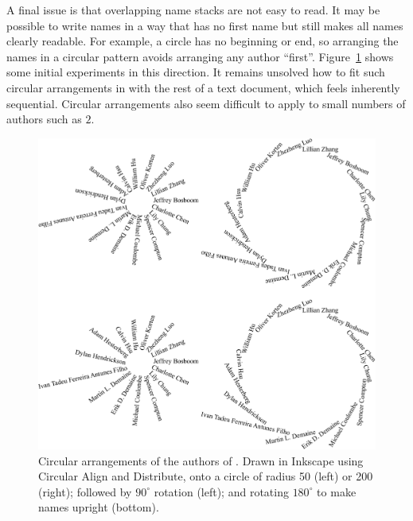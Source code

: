 \documentclass[natbib,authoryear]{sigtbd17-style}
\begin{document}
A final issue is that overlapping name stacks are not easy to read.
It may be possible to write names in a way that has no first name
but still makes all names clearly readable.
For example, a circle has no beginning or end, so arranging the names
in a circular pattern avoids arranging any author ``first''.
Figure~\ref{fig:circles} shows some initial experiments in this direction.
It remains unsolved how to fit such circular arrangements
in with the rest of a text document, which feels inherently sequential.
Circular arrangements also seem difficult to apply to small numbers of
authors such as $2$.

\begin{figure}
  \centering
  \includegraphics[width=\linewidth]{figs/circles}
  \caption{Circular arrangements of the authors of
    \citet{LessThanEdgeMatching_JIP}.  Drawn in Inkscape
    using Circular Align and Distribute, onto a circle of
    radius 50 (left) or 200 (right); followed by $90^\circ$ rotation
    (left); and rotating $180^\circ$ to make names upright (bottom).}
  \label{fig:circles}
\end{figure}




\end{document}
